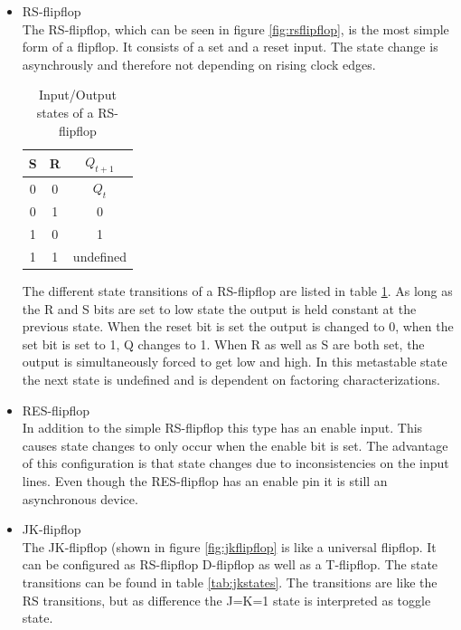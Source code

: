 \begin{itemize}
\item RS-flipflop\\
The RS-flipflop, which can be seen in figure \ref{fig:rsflipflop}, is the most simple form of a flipflop. It consists of a set and a reset input. The state change is asynchrously and therefore not depending on rising clock edges. 

\begin{table}
\begin{center}
\begin{tabular}{|c|c||c|}
\hline
S &  R & $Q_{t+1}$\\
\hline\hline
0 & 0 & $Q_{t}$\\
\hline
0 & 1 & 0\\
\hline
1 & 0 & 1\\
\hline
1 & 1 & undefined\\
\hline
\end{tabular}
\caption{Input/Output states of a RS-flipflop}
\label{tab:rsstates}
\end{center}
\end{table}

The different state transitions of a RS-flipflop are listed in table \ref{tab:rsstates}. As long as the R and S bits are set to low state the output is held constant at the previous state. When the reset bit is set the output is changed to 0, when the set bit is set to 1, Q changes to 1. When R as well as S are both set, the output is simultaneously forced to get low and high. In this metastable state the next state is undefined and is dependent on factoring characterizations.

\item RES-flipflop\\
In addition to the simple RS-flipflop this type has an enable input. This causes state changes to only occur when the enable bit is set. The advantage of this configuration is that state changes due to inconsistencies on the input lines. Even though the RES-flipflop has an enable pin it is still an asynchronous device.
\item JK-flipflop\\
The JK-flipflop (shown in figure \ref{fig:jkflipflop} is like a universal flipflop. It can be configured as RS-flipflop D-flipflop as well as a T-flipflop. The state transitions can be found in table \ref{tab:jkstates}. The transitions are like the RS transitions, but as difference the J=K=1 state is interpreted as toggle state.


\end{itemize}
